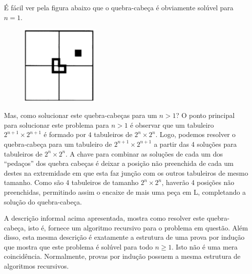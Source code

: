 É fácil ver pela figura abaixo que o quebra-cabeça é obviamente
solúvel para $n = 1$.
\begin{figure}[H]
  \centering
      \includegraphics[width=0.35\textwidth]{imagens/tab1.png}
 \end{figure}
Mas, como solucionar este quebra-cabeças para um $n > 1$? O ponto
principal para solucionar este problema para $n > 1$ é observar que um
tabuleiro $2^{n + 1} \times 2^{n + 1}$ é formado por $4$ tabuleiros de
$2^n\times 2^n$. Logo, podemos resolver o quebra-cabeça para um
tabuleiro de $2^{n + 1} \times 2^{n + 1}$ a partir das 4 soluções para
tabuleiros de $2^n\times 2^n$. A chave para combinar as soluções de
cada um dos ``pedaços'' dos quebra cabeças é deixar a posição não
preenchida de cada um destes na extremidade em que esta faz junção
com os outros tabuleiros de mesmo tamanho. Como são 4 tabuleiros de
tamanho $2^n\times 2^n$, haverão 4 posições não preenchidas,
permitindo assim o encaixe de mais uma peça em L, completando a
solução do quebra-cabeça.

A descrição informal acima apresentada, mostra como resolver este
quebra-cabeça, isto é, fornece um algoritmo recursivo para o problema
em questão. Além disso, esta mesma descrição é exatamente a estrutura
de uma prova por indução que mostra que este problema é solúvel para
todo $n \geq 1$. Isto não é uma mera coincidência. Normalmente, provas
por indução possuem a mesma estrutura de algoritmos recursivos.

